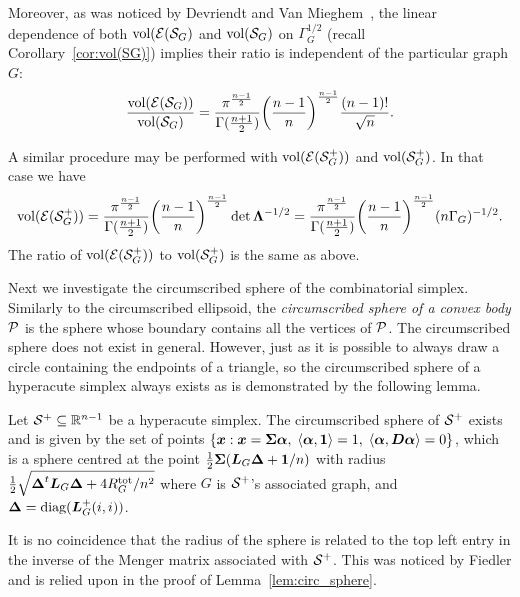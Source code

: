 Moreover, as was noticed by Devriendt  and  Van Mieghem~\cite{devriendt2018simplex},  the linear dependence of both $\vol(\El(\splx_G)$ and $\vol(\splx_G)$ on $\Gamma_G^{1/2}$ (recall Corollary~\ref{cor:vol(SG)}) implies their ratio is independent of the particular graph $G$: 
\begin{equation*}
\frac{\vol(\El(\splx_G))}{\vol(\splx_G)} = \frac{\pi^{\frac{n-1}{2}}}{\Gamma(\frac{n+1}{2})} \bigg(\frac{n-1}{n}\bigg)^{\frac{n-1}{2}} \frac{(n-1)!}{\sqrt{n}}.
\end{equation*}

A similar procedure may be performed  with $\vol(\El(\splx_G^+))$  and $\vol(\splx_G^+)$. In that  case we  have 
\begin{align*}
\vol(\El(\splx_G^+)) = \frac{\pi^{\frac{n-1}{2}}}{\Gamma(\frac{n+1}{2})} \bigg(\frac{n-1}{n}\bigg)^{\frac{n-1}{2}} \det\Eval^{-1/2} = \frac{\pi^{\frac{n-1}{2}}}{\Gamma(\frac{n+1}{2})} \bigg(\frac{n-1}{n}\bigg)^{\frac{n-1}{2}} (n\Gamma_G)^{-1/2}.
\end{align*}
The ratio  of $\vol(\El(\splx_G^+))$ to $\vol(\splx^+_G)$ is the same as above. 



Next we investigate the circumscribed sphere of the combinatorial  simplex. Similarly to the circumscribed ellipsoid, the \emph{circumscribed sphere  of a convex body $\P$} is the sphere whose boundary contains all the vertices of $\P$. The circumscribed sphere does not exist in general. However, just as it is possible to always draw a circle containing the endpoints  of a triangle, so the circumscribed sphere of a hyperacute simplex always exists  as is demonstrated  by the following lemma.  

\begin{lemma}
	\label{lem:circ_sphere}
	Let $\splx^+\subset\R^{n-1}$ be a hyperacute simplex. The circumscribed sphere  of $\splx^+$ exists and is given by the set of points $\{\x:\x=\Sv\balpha, \; \la \balpha,\one \ra = 1, \; \la \balpha,\D\balpha\ra =0\}$, which is a sphere centred at the point $\frac{1}{2}\Sv(\L_G\bD + \one/n)$ with radius $\frac{1}{2}\sqrt{\bD^\tp\L_G\bD + 4\Rtot_G/n^2}$ where $G$ is $\splx^+$'s associated graph, and $\bD = \diag(\L_G^+(i,i))$. 
\end{lemma}

\begin{remark}
	It is no coincidence that the radius of the sphere is related to the top left entry in the  inverse of the Menger matrix  associated with  $\splx^+$. This was  noticed by Fiedler and is relied  upon in  the proof of Lemma~\ref{lem:circ_sphere}. 
\end{remark}


